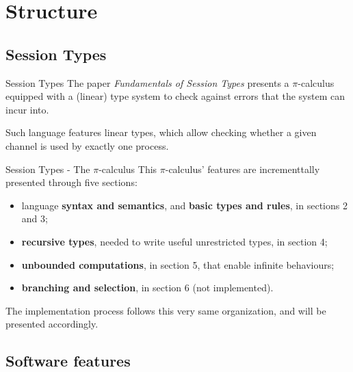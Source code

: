 \section{Structure}

\subsection*{Session Types}

\begin{frame}{Session Types}
    The paper \emph{Fundamentals of Session Types} %
    presents a $\pi$-calculus equipped with a (linear) type system to check against errors that the system can incur into.

    Such language features linear types, which allow checking whether a given channel is used by exactly one process.
\end{frame}

\begin{frame}{Session Types - The $\pi$-calculus}
    This $\pi$-calculus' features are incrementtally presented through five sections:
    \begin{itemize}
        \item language \textbf{syntax and semantics}, and \textbf{basic types and rules}, in sections 2 and 3;
        \item \textbf{recursive types}, needed to write useful unrestricted types, in section 4;
        \item \textbf{unbounded computations}, in section 5, that enable infinite behaviours;
        \item \textbf{branching and selection}, in section 6 (not implemented).
    \end{itemize}

    The implementation process follows this very same organization, and will be presented accordingly.
\end{frame}

\subsection*{Software features}

